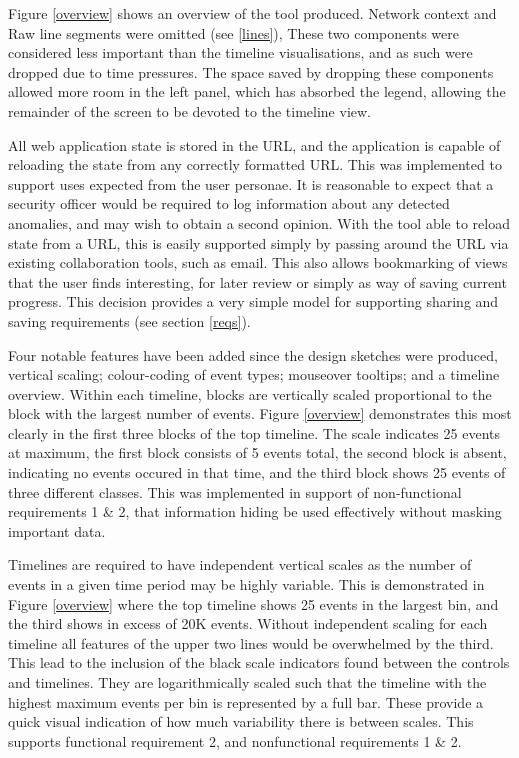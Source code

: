 Figure \ref{overview} shows an overview of the tool produced. Network context and Raw line segments were omitted (see \ref{lines}), These two components were considered less important than the timeline visualisations, and as such were dropped due to time pressures.  The space saved by dropping these components allowed more room in the left panel, which has absorbed the legend, allowing the remainder of the screen to be devoted to the timeline view. 

All web application state is stored in the URL, and the application is capable of reloading the state from any correctly formatted URL. This was implemented to support uses expected from the user personae. It is reasonable to expect that a security officer would be required to log information about any detected anomalies, and may wish to obtain a second opinion.
With the tool able to reload state from a URL, this is easily supported simply by passing around the URL via existing collaboration tools, such as email. 
This also allows bookmarking of views that the user finds interesting, for later review or simply as way of saving current progress.  This decision provides a very simple model for supporting sharing and saving requirements (see section \ref{reqs}).

Four notable features have been added since the design sketches were produced, vertical scaling; colour-coding of event types; mouseover tooltips; and a timeline overview. 
Within each timeline, blocks are vertically scaled proportional to the block with the largest number of events. Figure \ref{overview} demonstrates this most clearly in the first three blocks of the top timeline. The scale indicates 25 events at maximum, the first block consists of 5 events total, the second block is absent, indicating no events occured in that time, and the third block shows 25 events of three different classes. This was implemented in support of non-functional requirements 1 \& 2, that information hiding be used effectively without masking important data.

Timelines are required to have independent vertical scales as the number of events in a given time period may be highly variable. This is demonstrated in Figure \ref{overview} where the top timeline shows 25 events in the largest bin, and the third shows in excess of 20K events. Without independent scaling for each timeline all features of the upper two lines would be overwhelmed by the third. This lead to the inclusion of the black scale indicators found between the controls and timelines. They are logarithmically scaled such that the timeline with the highest maximum events per bin is represented by a full bar. These provide a quick visual indication of how much variability there is between scales. This supports functional requirement 2, and nonfunctional requirements 1 \& 2.

